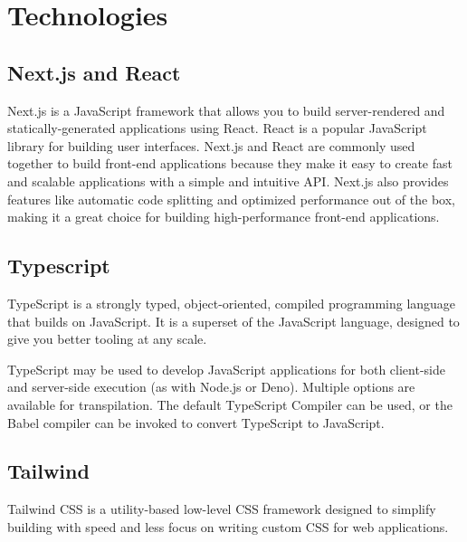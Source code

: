 \documentclass[singlecolumn]{article}
\begin{document}

\section{Technologies}
\subsection{Next.js and React}

Next.js is a JavaScript framework that allows you to build server-rendered and statically-generated applications using React. React is a popular JavaScript library for building user interfaces. Next.js and React are commonly used together to build front-end applications because they make it easy to create fast and scalable applications with a simple and intuitive API. Next.js also provides features like automatic code splitting and optimized performance out of the box, making it a great choice for building high-performance front-end applications.

\subsection{Typescript}
TypeScript is a strongly typed, object-oriented, compiled programming language that builds on JavaScript. It is a superset of the JavaScript language, designed to give you better tooling at any scale.


TypeScript may be used to develop JavaScript applications for both client-side and server-side execution (as with Node.js or Deno). Multiple options are available for transpilation. The default TypeScript Compiler can be used, or the Babel compiler can be invoked to convert TypeScript to JavaScript.

\subsection{Tailwind}
Tailwind CSS is a utility-based low-level CSS framework designed to simplify building with speed and less focus on writing custom CSS for web applications.
\end{document}
